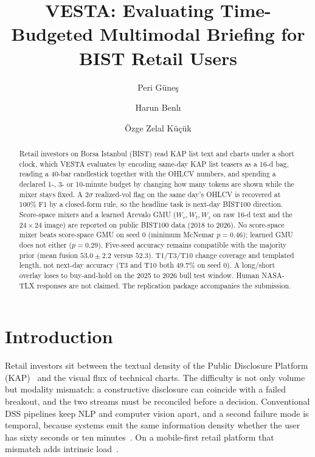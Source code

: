 \documentclass{llncs}
\begin{document}
\pagestyle{plain}
\mainmatter
\title{VESTA: Evaluating Time-Budgeted Multimodal Briefing for BIST Retail Users}
\author{Peri G{\"u}ne\c{s} \and Harun Benl{\i} \and {\"O}zge Zelal K{\"u}\c{c}{\"u}k}
\maketitle

\begin{abstract}
Retail investors on Borsa Istanbul (BIST) read KAP list text and charts under a short clock, which VESTA evaluates by encoding same-day KAP list teasers as a 16-d bag, reading a 40-bar candlestick together with the OHLCV numbers, and spending a declared 1-, 3- or 10-minute budget by changing how many tokens are shown while the mixer stays fixed. A $2\sigma$ realized-vol flag on the same day's OHLCV is recovered at 100\% F1 by a closed-form rule, so the headline task is next-day BIST100 direction. Score-space mixers and a learned Arevalo GMU ($W_v,W_t,W_z$ on raw 16-d text and the $24\times24$ image) are reported on public BIST100 data (2018 to 2026). No score-space mixer beats score-space GMU on seed 0 (minimum McNemar $p=0.46$); learned GMU does not either ($p=0.29$). Five-seed accuracy remains compatible with the majority prior (mean fusion $53.0\pm2.2$ versus $52.3$). T1/T3/T10 change coverage and templated length, not next-day accuracy (T3 and T10 both 49.7\% on seed 0). A long/short overlay loses to buy-and-hold on the 2025 to 2026 bull test window. Human NASA-TLX responses are not claimed. The replication package accompanies the submission.

\end{abstract}

\section{Introduction}
Retail investors sit between the textual density of the Public Disclosure Platform (KAP)~\cite{kap2026} and the visual flux of technical charts. The difficulty is not only volume but modality mismatch: a constructive disclosure can coincide with a failed breakout, and the two streams must be reconciled before a decision. Conventional DSS pipelines keep NLP and computer vision apart, and a second failure mode is temporal, because systems emit the same information density whether the user has sixty seconds or ten minutes~\cite{eppler2004overload,miller1956magical,sweller1988cognitive}. On a mobile-first retail platform that mismatch adds intrinsic load~\cite{sweller2023clt}.
\end{document}
